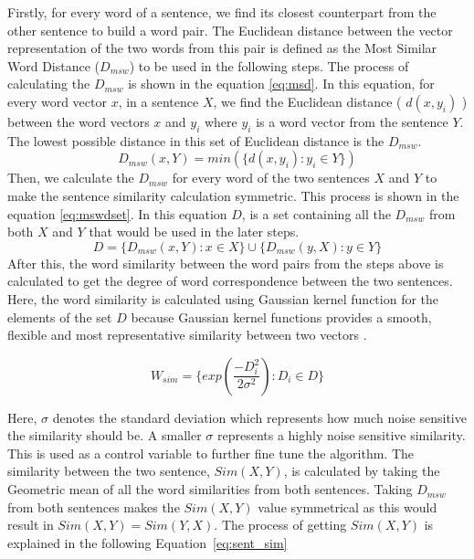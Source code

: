 Firstly, for every word of a sentence, we find its closest counterpart from the other sentence to build a word pair. The Euclidean distance between the vector representation of the two words from this pair is defined as the Most Similar Word Distance ($D_{msw}$) to be used in the following steps. The process of calculating the $D_{msw}$ is shown in the equation \ref{eq:msd}. In this equation, for every word vector $x$, in a sentence $X$, we find the Euclidean distance ( $d(x,y_i)$ ) between the word vectors $x$ and $y_i$ where $y_i$ is a word vector from the sentence $Y$. The lowest possible distance in this set of Euclidean distance is the $D_{msw}$. 
\begin{equation}\label{eq:msd}
    D_{msw}(x,Y) = min(\{d(x,y_i) : y_i \in Y \})
\end{equation}
Then, we calculate the $D_{msw}$ for every word of the two sentences $X$ and $Y$ to make the sentence similarity calculation symmetric. This process is shown in the equation \ref{eq:mswdset}. In this equation $D$, is a set containing all the $D_{msw}$ from both $X$ and $Y$ that would be used in the later steps.
\begin{equation}
    D = \{D_{msw}(x,Y) : x \in X\} \cup \{D_{msw}(y,X) : y \in Y\}
    \label{eq:mswdset}
\end{equation}
After this, the word similarity between the word pairs from the steps above is calculated to get the degree of word correspondence between the two sentences. Here, the word similarity is calculated using Gaussian kernel function for the elements of the set $D$ because Gaussian kernel functions provides a smooth, flexible and most representative similarity between two vectors \cite{babud1986gaussian}.    

\begin{equation}\label{eq:wsim}
    W_{sim} = \{ exp\left(\frac{-D_i^2}{2\sigma^2}\right) : D_i \in D\}
\end{equation}

Here, $\sigma$ denotes the standard deviation which represents how much noise sensitive the similarity should be. A smaller $\sigma$ represents a highly noise sensitive similarity. This is used as a control variable to further fine tune the algorithm. The similarity between the two sentence, $Sim(X,Y)$, is calculated by taking the Geometric mean of all the word similarities from both sentences. Taking $D_{msw}$ from both sentences makes the $Sim(X,Y)$ value symmetrical as this would result in $Sim(X,Y) = Sim(Y,X)$. The process of getting $Sim(X,Y)$ is explained in the following Equation~\ref{eq:sent_sim}

